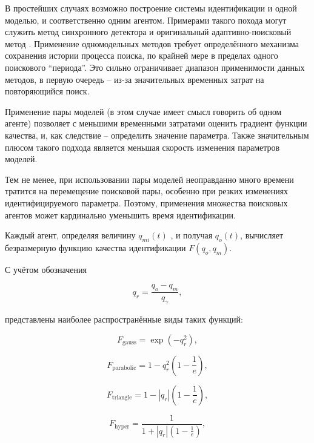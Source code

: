 \documentclass[a4paper,paratype,12pt,fouriernc]{cmonogra}
\begin{document}
В простейших случаях возможно построение системы идентификации
и одной моделью, и соответственно одним агентом.
Примерами такого похода могут служить
метод синхронного детектора \cite{adopt_cont_sys}
и оригинальный адаптивно-поисковый метод \cite{mich_92}.
Применение одномодельных методов требует определённого механизма
сохранения истории процесса поиска, по крайней мере в пределах
одного поискового ``периода''. Это сильно ограничивает диапазон
применимости данных методов, в первую очередь -- из-за значительных
временных затрат на повторяющийся поиск.

Применение пары моделей \cite{atu_asau3}
(в этом случае имеет смысл говорить об одном агенте)
позволяет с меньшими временными затратами оценить градиент функции качества,
и, как следствие -- определить значение параметра. Также значительным плюсом
такого подхода является меньшая скорость изменения параметров моделей.

Тем не менее, при использовании пары моделей неоправданно много времени
тратится на перемещение поисковой пары, особенно при резких изменениях
идентифицируемого параметра. Поэтому, применения множества
поисковых агентов может кардинально уменьшить время идентификации.

Каждый агент, определяя величину $q_{mi}(t)$ , и получая $q_o(t)$,
вычисляет безразмерную функцию качества идентификации
$F(q_o,q_m)$.

С учётом обозначения

\[
  q_r = \frac{q_o - q_m}{q_\gamma},
\]

\noindent
представлены наиболее распространённые виды таких функций:

\begin{equation}
  F_{\mathrm{gauss}} = \exp( - q_r^2 ),
\label{atu:eq:F_gauss}
\end{equation}

\begin{equation}
  F_{\mathrm{parabolic}} = 1 - q_r^2 \left( 1 - \frac{1}{e} \right),
\label{atu:eq:F_parabolic}
\end{equation}

\begin{equation}
  F_{\mathrm{triangle}} = 1 - |q_r| \left( 1 - \frac{1}{e} \right),
\label{atu:eq:F_triangle}
\end{equation}

\begin{equation}
  F_{\mathrm{hyper}} = \frac{1}{ 1 + |q_r| \left( 1 - \frac{1}{e} \right)},
\label{atu:eq:F_hyper}
\end{equation}
\end{document}
